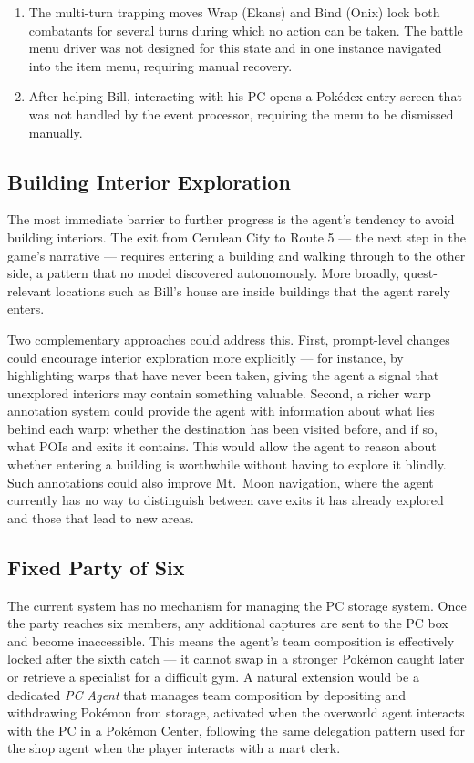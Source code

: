 \documentclass{article}
\begin{document}
\begin{enumerate}
  \item The multi-turn trapping moves Wrap (Ekans) and Bind (Onix) lock both combatants for several turns during which no action can be taken. The battle menu driver was not designed for this state and in one instance navigated into the item menu, requiring manual recovery.
  \item After helping Bill, interacting with his PC opens a Pok\'{e}dex entry screen that was not handled by the event processor, requiring the menu to be dismissed manually.
\end{enumerate}

\subsection{Building Interior Exploration}

The most immediate barrier to further progress is the agent's tendency to avoid building interiors. The exit from Cerulean City to Route 5 --- the next step in the game's narrative --- requires entering a building and walking through to the other side, a pattern that no model discovered autonomously. More broadly, quest-relevant locations such as Bill's house are inside buildings that the agent rarely enters.

Two complementary approaches could address this. First, prompt-level changes could encourage interior exploration more explicitly --- for instance, by highlighting warps that have never been taken, giving the agent a signal that unexplored interiors may contain something valuable. Second, a richer warp annotation system could provide the agent with information about what lies behind each warp: whether the destination has been visited before, and if so, what POIs and exits it contains. This would allow the agent to reason about whether entering a building is worthwhile without having to explore it blindly. Such annotations could also improve Mt.\ Moon navigation, where the agent currently has no way to distinguish between cave exits it has already explored and those that lead to new areas.

\subsection{Fixed Party of Six}

The current system has no mechanism for managing the PC storage system. Once the party reaches six members, any additional captures are sent to the PC box and become inaccessible. This means the agent's team composition is effectively locked after the sixth catch --- it cannot swap in a stronger Pok\'{e}mon caught later or retrieve a specialist for a difficult gym. A natural extension would be a dedicated \emph{PC Agent} that manages team composition by depositing and withdrawing Pok\'{e}mon from storage, activated when the overworld agent interacts with the PC in a Pok\'{e}mon Center, following the same delegation pattern used for the shop agent when the player interacts with a mart clerk.
\end{document}
